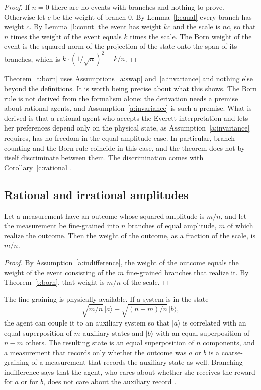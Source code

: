 \documentclass{situationist-preprint}
\begin{document}
\begin{proof}
If $n=0$ there are no events with branches and nothing to prove. Otherwise let $c$ be the weight of branch $0$. By Lemma~\ref{l:equal} every branch has weight $c$. By Lemma~\ref{l:count} the event has weight $kc$ and the scale is $nc$, so that $n$ times the weight of the event equals $k$ times the scale. The Born weight of the event is the squared norm of the projection of the state onto the span of its branches, which is $k\cdot(1/\sqrt{n})^2=k/n$.
\end{proof}

\begin{remark}\label{r:assumed}
Theorem~\ref{t:born} uses Assumptions~\ref{a:swap} and~\ref{a:invariance} and nothing else beyond the definitions. It is worth being precise about what this shows. The Born rule is not derived from the formalism alone: the derivation needs a premise about rational agents, and Assumption~\ref{a:invariance} is such a premise. What is derived is that a rational agent who accepts the Everett interpretation and lets her preferences depend only on the physical state, as Assumption~\ref{a:invariance} requires, has no freedom in the equal-amplitude case. In particular, branch counting and the Born rule coincide in this case, and the theorem does not by itself discriminate between them. The discrimination comes with Corollary~\ref{c:rational}.
\end{remark}

\subsection{Rational and irrational amplitudes}

\begin{corollary}\label{c:rational}
Let a measurement have an outcome whose squared amplitude is $m/n$, and let the measurement be fine-grained into $n$ branches of equal amplitude, $m$ of which realize the outcome. Then the weight of the outcome, as a fraction of the scale, is $m/n$.
\end{corollary}

\begin{proof}
By Assumption~\ref{a:indifference}, the weight of the outcome equals the weight of the event consisting of the $m$ fine-grained branches that realize it. By Theorem~\ref{t:born}, that weight is $m/n$ of the scale.
\end{proof}

The fine-graining is physically available. If a system is in the state
\[\sqrt{m/n}\,\lvert a\rangle+\sqrt{(n-m)/n}\,\lvert b\rangle,\]
the agent can couple it to an auxiliary system so that $\lvert a\rangle$ is correlated with an equal superposition of $m$ auxiliary states and $\lvert b\rangle$ with an equal superposition of $n-m$ others. The resulting state is an equal superposition of $n$ components, and a measurement that records only whether the outcome was $a$ or $b$ is a coarse-graining of a measurement that records the auxiliary state as well. Branching indifference says that the agent, who cares about whether she receives the reward for $a$ or for $b$, does not care about the auxiliary record \citep{Deutsch1999,Wallace2007}.
\end{document}
